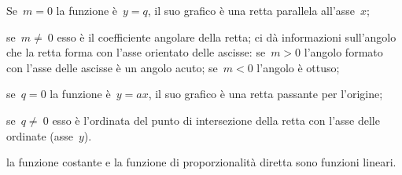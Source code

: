 \begin{itemize*}
 \item Se~$m=0$ la funzione è~$y=q$, il suo grafico è una retta parallela all'asse~$x$;
 \item se~$m\neq~0$ esso è il coefficiente angolare della retta; ci dà informazioni sull'angolo che la retta
 forma con l'asse orientato delle ascisse: se~$m>0$ l'angolo formato con l'asse delle ascisse è un angolo acuto; se~$m<0$ l'angolo è ottuso;
 \item se~$q=0$ la funzione è~$y=ax$, il suo grafico è una retta passante per l'origine;
 \item se~$q\neq~0$ esso è l'ordinata del punto di intersezione della retta con l'asse delle ordinate (asse~$y$).
\end{itemize*}
\begin{center}
 
\end{center}

\conclusione la funzione costante e la funzione di proporzionalità diretta sono funzioni lineari.

